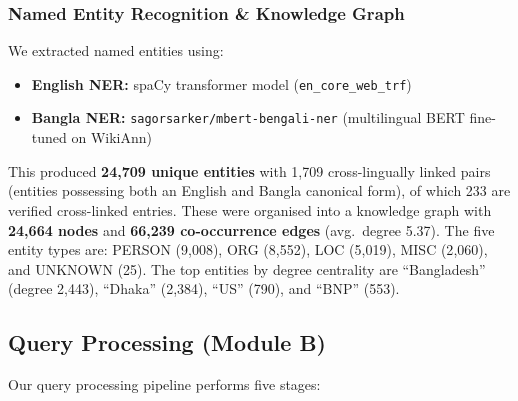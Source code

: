 \documentclass[12pt,a4paper]{article}
\begin{document}
\subsubsection{Named Entity Recognition \& Knowledge Graph}

We extracted named entities using:
\begin{itemize}
    \item \textbf{English NER:} spaCy transformer model (\texttt{en\_core\_web\_trf})
    \item \textbf{Bangla NER:} \texttt{sagorsarker/mbert-bengali-ner} (multilingual BERT fine-tuned on WikiAnn)
\end{itemize}

This produced \textbf{24{,}709 unique entities} with 1{,}709 cross-lingually linked pairs (entities possessing both an English and Bangla canonical form), of which 233 are verified cross-linked entries. These were organised into a knowledge graph with \textbf{24{,}664 nodes} and \textbf{66{,}239 co-occurrence edges} (avg.\ degree 5.37). The five entity types are: PERSON (9{,}008), ORG (8{,}552), LOC (5{,}019), MISC (2{,}060), and UNKNOWN (25). The top entities by degree centrality are ``Bangladesh'' (degree 2{,}443), ``Dhaka'' (2{,}384), ``US'' (790), and ``BNP'' (553).


\subsection{Query Processing (Module B)}

Our query processing pipeline performs five stages:
\end{document}
